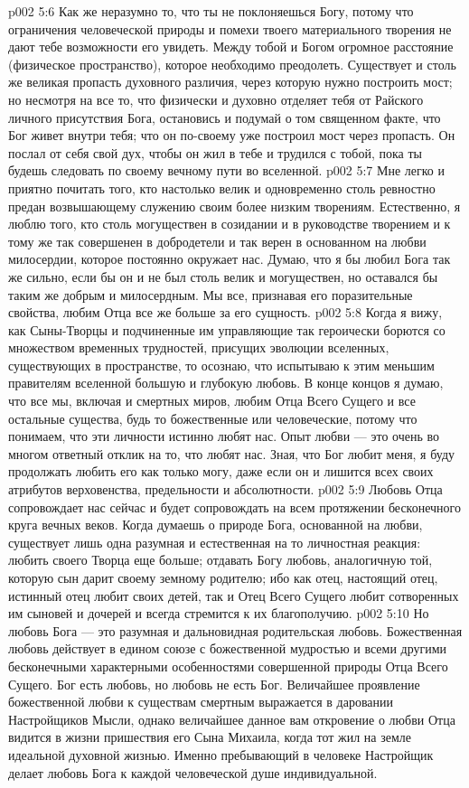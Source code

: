 \vs p002 5:6 \pc Как же неразумно то, что ты не поклоняешься Богу, потому что ограничения человеческой природы и помехи твоего материального творения не дают тебе возможности его увидеть. Между тобой и Богом огромное расстояние (физическое пространство), которое необходимо преодолеть. Существует и столь же великая пропасть духовного различия, через которую нужно построить мост; но несмотря на все то, что физически и духовно отделяет тебя от Райского личного присутствия Бога, остановись и подумай о том священном факте, что Бог живет внутри тебя; что он по\hyp{}своему уже построил мост через пропасть. Он послал от себя свой дух, чтобы он жил в тебе и трудился с тобой, пока ты будешь следовать по своему вечному пути во вселенной.
\vs p002 5:7 Мне легко и приятно почитать того, кто настолько велик и одновременно столь ревностно предан возвышающему служению своим более низким творениям. Естественно, я люблю того, кто столь могуществен в созидании и в руководстве творением и к тому же так совершенен в добродетели и так верен в основанном на любви милосердии, которое постоянно окружает нас. Думаю, что я бы любил Бога так же сильно, если бы он и не был столь велик и могуществен, но оставался бы таким же добрым и милосердным. Мы все, признавая его поразительные свойства, любим Отца все же больше за его сущность.
\vs p002 5:8 Когда я вижу, как Сыны\hyp{}Творцы и подчиненные им управляющие так героически борются со множеством временных трудностей, присущих эволюции вселенных, существующих в пространстве, то осознаю, что испытываю к этим меньшим правителям вселенной большую и глубокую любовь. В конце концов я думаю, что все мы, включая и смертных миров, любим Отца Всего Сущего и все остальные существа, будь то божественные или человеческие, потому что понимаем, что эти личности истинно любят нас. Опыт любви --- это очень во многом ответный отклик на то, что любят нас. Зная, что Бог любит меня, я буду продолжать любить его как только могу, даже если он и лишится всех своих атрибутов верховенства, предельности и абсолютности.
\vs p002 5:9 Любовь Отца сопровождает нас сейчас и будет сопровождать на всем протяжении бесконечного круга вечных веков. Когда думаешь о природе Бога, основанной на любви, существует лишь одна разумная и естественная на то личностная реакция: любить своего Творца еще больше; отдавать Богу любовь, аналогичную той, которую сын дарит своему земному родителю; ибо как отец, настоящий отец, истинный отец любит своих детей, так и Отец Всего Сущего любит сотворенных им сыновей и дочерей и всегда стремится к их благополучию.
\vs p002 5:10 Но любовь Бога --- это разумная и дальновидная родительская любовь. Божественная любовь действует в едином союзе с божественной мудростью и всеми другими бесконечными характерными особенностями совершенной природы Отца Всего Сущего. Бог есть любовь, но любовь не есть Бог. Величайшее проявление божественной любви к существам смертным выражается в даровании Настройщиков Мысли, однако величайшее данное вам откровение о любви Отца видится в жизни пришествия его Сына Михаила, когда тот жил на земле идеальной духовной жизнью. Именно пребывающий в человеке Настройщик делает любовь Бога к каждой человеческой душе индивидуальной.
